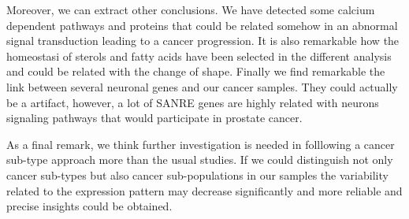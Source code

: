 \documentclass[9pt,twocolumn,twoside]{gsajnl}
\begin{document}
Moreover, we can extract other conclusions. We have detected some calcium dependent pathways and proteins that could be related somehow in an abnormal signal transduction leading to a cancer progression. It is also remarkable how the homeostasi of sterols and fatty acids have been selected in the different analysis and could be related with the change of shape. Finally we find remarkable the link between several neuronal genes and our cancer samples. They could actually be a artifact, however, a lot of SANRE genes are highly related with neurons signaling pathways that would participate in prostate cancer. 

As a final remark, we think further investigation is needed in folllowing a cancer sub-type approach more than the usual studies. If we could distinguish not only cancer sub-types but also cancer sub-populations in our samples the variability related to the expression pattern may decrease significantly and more reliable and precise insights could be obtained.








\end{document}
